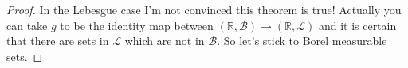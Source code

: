 \documentclass[letter]{article}
\newenvironment{menumerate}{%
  \edef\backupindent{\the\parindent}%
  \enumerate%
  \setlength{\parindent}{\backupindent}%
}{\endenumerate}
\begin{document}
\begin{menumerate}
\begin{proof}
		 In the Lebesgue case I'm not convinced this theorem is true! Actually you can take $g$ to be the identity map between $(\mathbb{R}, \mathcal{B}) \to (\mathbb{R}, \mathcal{L})$ and it is certain that there are sets in $\mathcal{L}$ which are not in $\mathcal{B}$. So let's stick to Borel measurable sets.
	\end{proof}

\end{menumerate}
\end{document}
